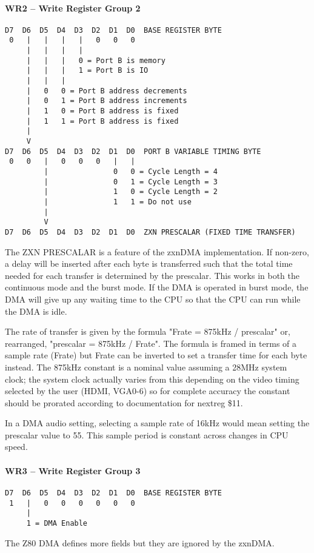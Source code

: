 \paragraph{WR2 – Write Register Group 2}
\begin{verbatim}
D7  D6  D5  D4  D3  D2  D1  D0  BASE REGISTER BYTE
 0   |   |   |   |   0   0   0
     |   |   |   |
     |   |   |   0 = Port B is memory
     |   |   |   1 = Port B is IO
     |   |   |
     |   0   0 = Port B address decrements
     |   0   1 = Port B address increments
     |   1   0 = Port B address is fixed
     |   1   1 = Port B address is fixed
     |
     V
D7  D6  D5  D4  D3  D2  D1  D0  PORT B VARIABLE TIMING BYTE
 0   0   |   0   0   0   |   |
         |               0   0 = Cycle Length = 4
         |               0   1 = Cycle Length = 3
         |               1   0 = Cycle Length = 2
         |               1   1 = Do not use
         |
         V
D7  D6  D5  D4  D3  D2  D1  D0  ZXN PRESCALAR (FIXED TIME TRANSFER)
\end{verbatim}
The ZXN PRESCALAR is a feature of the zxnDMA implementation. If
non-zero, a delay will be inserted after each byte is transferred such
that the total time needed for each transfer is determined by the
prescalar. This works in both the continuous mode and the burst
mode. If the DMA is operated in burst mode, the DMA will give up any
waiting time to the CPU so that the CPU can run while the DMA is idle.

The rate of transfer is given by the formula "Frate = 875kHz /
prescalar" or, rearranged, "prescalar = 875kHz / Frate". The formula
is framed in terms of a sample rate (Frate) but Frate can be inverted
to set a transfer time for each byte instead. The 875kHz constant is a
nominal value assuming a 28MHz system clock; the system clock actually
varies from this depending on the video timing selected by the user
(HDMI, VGA0-6) so for complete accuracy the constant should be
prorated according to documentation for nextreg \$11.

In a DMA audio setting, selecting a sample rate of 16kHz would mean
setting the prescalar value to 55. This sample period is constant
across changes in CPU speed.

\paragraph{WR3 – Write Register Group 3}
\begin{verbatim}
D7  D6  D5  D4  D3  D2  D1  D0  BASE REGISTER BYTE
 1   |   0   0   0   0   0   0
     |
     1 = DMA Enable
\end{verbatim}
The Z80 DMA defines more fields but they are ignored by the zxnDMA.

